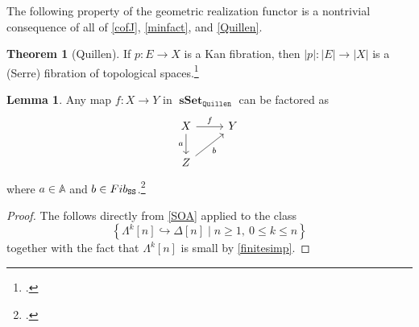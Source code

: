 \documentclass[10pt,letterpaper,cm]{nupset}
\theoremstyle{definition}
\theoremstyle{theorem}
\newtheorem{theorem}[definition]{Theorem}
\newtheorem{lemma}[definition]{Lemma}
\newtheorem{prop}[definition]{Proposition}
\theoremstyle{remark}
\newcommand{\0}{\mathbf{0}}
\newcommand{\1}{\mathbf{1}}
\newcommand{\2}{\mathbf{2}}
\DeclareMathOperator{\sset}{\mathbf{sSet}}
\DeclareMathOperator{\fib}{\mathnormal{Fib}}
\DeclareMathOperator{\cof}{\mathnormal{Cof}}
\begin{document}
\smallskip

The following property of the geometric realization functor is a nontrivial consequence of all of \cref{cofJ}, \cref{minfact}, and \cref{Quillen}.

\begin{theorem}[Quillen]\label{fibpres}
If $p : E \to X$ is a Kan fibration, then $\left\lvert{p}\right\rvert : \left\lvert{E}\right\rvert \to \left\lvert{X}\right\rvert$ is a (Serre) fibration of topological spaces.\footnote{\cite[Theorem 10.10]{goerss}.}
\end{theorem}

\begin{comment}
\smallskip

\begin{prop}\label{RLPTB}
A map in $\sset_{\mathtt{Quillen}}$ has the right lifting property against $\cof$ if and only if it is a trivial fibration.
\end{lemma}
\begin{proof}
\textit{To appear.}
\end{proof}

\end{comment}

\medskip

\begin{lemma}\label{fact1}
Any map $f: X \to Y$ in $\sset_{\mathtt{Quillen}}$ can be factored as
\[
\begin{tikzcd}
X \arrow[r, "f"] \arrow[d, "a"'] & Y \\
Z \arrow[ru, "b"']          &  
\end{tikzcd}
\] where $a\in \mathbb{A}$ and $b \in \fib_{\mathtt{SS}}$.\footnote{\autocite[Theorem 3.1.1]{Joyal}.}
\end{lemma}
\begin{proof}
The follows directly from \cref{SOA} applied to the class  $$\left\{\Lambda^k[n] \hookrightarrow \Delta[n] \mid n \geq 1, \ 0\leq k \leq n\right\}$$ together with the fact that $\Lambda^k[n]$ is small by \cref{finitesimp}.
\end{proof}
\end{document}

